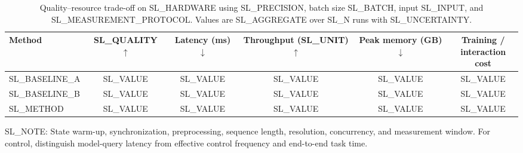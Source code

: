 \begin{table}[t]
  \centering
  \small
  \caption{Quality--resource trade-off on SL_HARDWARE using SL_PRECISION,
  batch size SL_BATCH, input SL_INPUT, and SL_MEASUREMENT_PROTOCOL. Values are
  SL_AGGREGATE over SL_N runs with SL_UNCERTAINTY.}
  \label{tab:SL_LABEL}
  \begin{tabular}{lccccc}
    \toprule
    Method & SL_QUALITY $\uparrow$ & Latency (ms) $\downarrow$ &
    \shortstack{Throughput\\(SL_UNIT) $\uparrow$} & \shortstack{Peak memory\\(GB) $\downarrow$} &
    \shortstack{Training /\\interaction cost} \\
    \midrule
    SL_BASELINE_A & SL_VALUE & SL_VALUE & SL_VALUE & SL_VALUE & SL_VALUE \\
    SL_BASELINE_B & SL_VALUE & SL_VALUE & SL_VALUE & SL_VALUE & SL_VALUE \\
    SL_METHOD     & SL_VALUE & SL_VALUE & SL_VALUE & SL_VALUE & SL_VALUE \\
    \bottomrule
  \end{tabular}

  \parbox{0.98\linewidth}{\footnotesize
  SL_NOTE: State warm-up, synchronization, preprocessing, sequence length,
  resolution, concurrency, and measurement window. For control, distinguish
  model-query latency from effective control frequency and end-to-end task time.}
\end{table}
